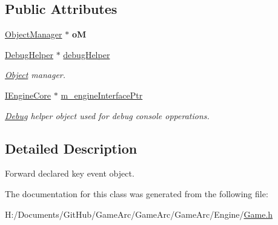 \subsection*{Public Attributes}
\begin{DoxyCompactItemize}
\item 
\hypertarget{class_game_a713d1977c05e5003d15492eb036eacf4}{\hyperlink{class_object_manager}{Object\+Manager} $\ast$ {\bfseries o\+M}}\label{class_game_a713d1977c05e5003d15492eb036eacf4}

\item 
\hypertarget{class_game_a4efa8c90dc6278091beaa1313c6a9bdc}{\hyperlink{class_debug_helper}{Debug\+Helper} $\ast$ \hyperlink{class_game_a4efa8c90dc6278091beaa1313c6a9bdc}{debug\+Helper}}\label{class_game_a4efa8c90dc6278091beaa1313c6a9bdc}

\begin{DoxyCompactList}\small\item\em \hyperlink{class_object}{Object} manager. \end{DoxyCompactList}\item 
\hypertarget{class_game_ad01d32edc479a3edc79e5a3d7b4281d2}{\hyperlink{class_i_engine_core}{I\+Engine\+Core} $\ast$ \hyperlink{class_game_ad01d32edc479a3edc79e5a3d7b4281d2}{m\+\_\+engine\+Interface\+Ptr}}\label{class_game_ad01d32edc479a3edc79e5a3d7b4281d2}

\begin{DoxyCompactList}\small\item\em \hyperlink{class_debug}{Debug} helper object used for debug console opperations. \end{DoxyCompactList}\end{DoxyCompactItemize}


\subsection{Detailed Description}
Forward declared key event object. 

The documentation for this class was generated from the following file\+:\begin{DoxyCompactItemize}
\item 
H\+:/\+Documents/\+Git\+Hub/\+Game\+Arc/\+Game\+Arc/\+Game\+Arc/\+Engine/\hyperlink{_game_8h}{Game.\+h}\end{DoxyCompactItemize}
